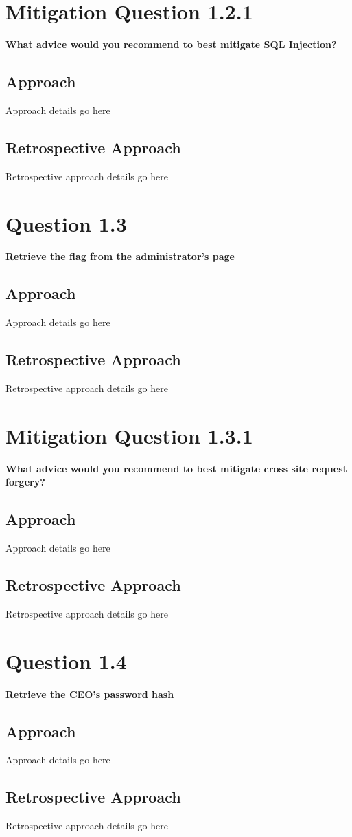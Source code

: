 \section{Mitigation Question 1.2.1}
\textbf{What advice would you recommend to best mitigate SQL Injection?}
\subsection{Approach}
Approach details go here
\subsection{Retrospective Approach}
Retrospective approach details go here

\section{Question 1.3}
\textbf{Retrieve the flag from the administrator's page}
\subsection{Approach}
Approach details go here
\subsection{Retrospective Approach}
Retrospective approach details go here

\section{Mitigation Question 1.3.1}
\textbf{What advice would you recommend to best mitigate cross site request
forgery?}
\subsection{Approach}
Approach details go here
\subsection{Retrospective Approach}
Retrospective approach details go here

\section{Question 1.4}
\textbf{Retrieve the CEO's password hash}
\subsection{Approach}
Approach details go here
\subsection{Retrospective Approach}
Retrospective approach details go here
